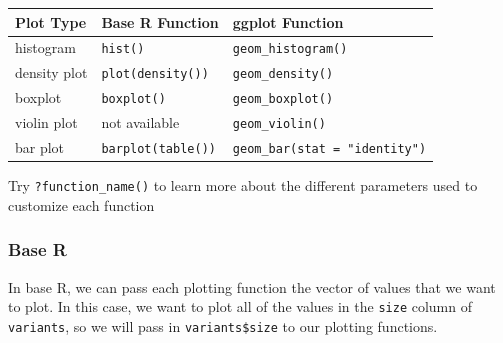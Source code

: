 \documentclass[
  letterpaper,
  DIV=11,
  numbers=noendperiod]{scrreprt}
\newenvironment{Shaded}{\begin{snugshade}}{\end{snugshade}}
\newcommand{\DocumentationTok}[1]{\textcolor[rgb]{0.37,0.37,0.37}{\textit{#1}}}
\newcommand{\FunctionTok}[1]{\textcolor[rgb]{0.28,0.35,0.67}{#1}}
\newcommand{\NormalTok}[1]{\textcolor[rgb]{0.00,0.23,0.31}{#1}}
\newcommand{\SpecialCharTok}[1]{\textcolor[rgb]{0.37,0.37,0.37}{#1}}
\begin{document}
\begin{longtable}[]{@{}lll@{}}
\toprule\noalign{}
Plot Type & Base R Function & ggplot Function \\
\midrule\noalign{}
\endhead
\bottomrule\noalign{}
\endlastfoot
histogram & \texttt{hist()} & \texttt{geom\_histogram()} \\
density plot & \texttt{plot(density())} & \texttt{geom\_density()} \\
boxplot & \texttt{boxplot()} & \texttt{geom\_boxplot()} \\
violin plot & not available & \texttt{geom\_violin()} \\
bar plot & \texttt{barplot(table())} &
\texttt{geom\_bar(stat\ =\ "identity")} \\
\end{longtable}

\begin{tcolorbox}[enhanced jigsaw, bottomtitle=1mm, bottomrule=.15mm, toprule=.15mm, opacityback=0, leftrule=.75mm, breakable, colback=white, toptitle=1mm, left=2mm, coltitle=black, titlerule=0mm, opacitybacktitle=0.6, title=\textcolor{quarto-callout-tip-color}{\faLightbulb}\hspace{0.5em}{Tip}, rightrule=.15mm, arc=.35mm, colframe=quarto-callout-tip-color-frame, colbacktitle=quarto-callout-tip-color!10!white]

Try \texttt{?function\_name()} to learn more about the different
parameters used to customize each function

\end{tcolorbox}

\subsubsection{Base R}\label{base-r-1}

In base R, we can pass each plotting function the vector of values that
we want to plot. In this case, we want to plot all of the values in the
\texttt{size} column of \texttt{variants}, so we will pass in
\texttt{variants\$size} to our plotting functions.

\begin{Shaded}
\end{Shaded}
\end{document}
